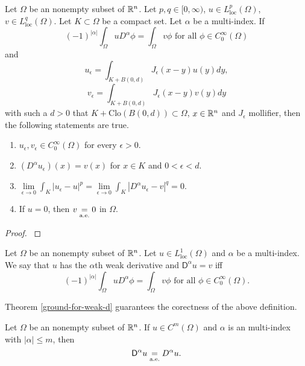 \documentclass[main.tex]{subfiles}
\begin{document}
\begin{theorem}
\label{ground-for-weak-d}
Let $\Omega$ be an nonempty subset of $\mathbb{R}^n$. Let $p,q\in[0, \infty)$, $u\in L_{\text{loc}}^p(\Omega)$, $v\in L_{\text{loc}}^q(\Omega)$. Let $K\subset \Omega$ be a compact set. Let $\alpha$ be a multi-index. If
\begin{equation}
(-1)^{|\alpha|}\int_{\Omega} uD^\alpha \phi = \int_{\Omega}v\phi \text{ for all } \phi\in C_0^\infty(\Omega)
\end{equation}
and
\begin{equation}
u_\epsilon=\int_{K+B(0,d)}J_\epsilon(x - y)u(y)dy,
\end{equation}
\begin{equation}
v_\epsilon=\int_{K+B(0,d)}J_\epsilon(x - y)v(y)dy
\end{equation}
with such a $d>0$ that $K + \text{Clo}(B(0, d))\subset \Omega$, $x\in \mathbb{R}^n$ and $J_\epsilon$ mollifier, then the following statements are true.
\begin{enumerate}
\item $u_\epsilon, v_\epsilon\in C_0^\infty(\Omega)$ for every $\epsilon > 0$.
\item $(D^\alpha u_\epsilon)(x) = v(x)$ for $x\in K$ and $0 < \epsilon < d$.
\item $\lim\limits_{\epsilon\to 0}\int_{K}|u_\epsilon - u|^p = \lim\limits_{\epsilon\to 0}\int_{K}|D^\alpha u_\epsilon - v|^q = 0$.
\item If $u = 0$, then $v\underset{\text{a.e.}}{=} 0$ in $\Omega$.
\end{enumerate} 
\end{theorem}
\begin{proof}
\cite[see][3.4]{miklavcic1998}
\end{proof}
\begin{definition}
Let $\Omega$ be an nonempty subset of $\mathbb{R}^n$.
Let $u\in L^1_{\text{loc}}(\Omega)$ and $\alpha$ be a multi-index.
We say that $u$ has the $\alpha$th weak derivative and $\mathsf{D}^\alpha u = v$ iff
\begin{equation}
(-1)^{|\alpha|}\int_{\Omega} uD^\alpha \phi = \int_{\Omega}v\phi \text{ for all } \phi\in C_0^\infty(\Omega).
\end{equation} 
\end{definition}
Theorem \ref{ground-for-weak-d} guarantees the corectness of the above definition.
\begin{theorem}
Let $\Omega$ be an nonempty subset of $\mathbb{R}^n$.
If $u\in C^m(\Omega)$ and $\alpha$ is an multi-index with $|\alpha | \leq m$, then
\begin{equation}
\mathsf{D}^\alpha u \underset{\text{a.e.}}{=} D^\alpha u.
\end{equation}
\end{theorem}
\end{document}
